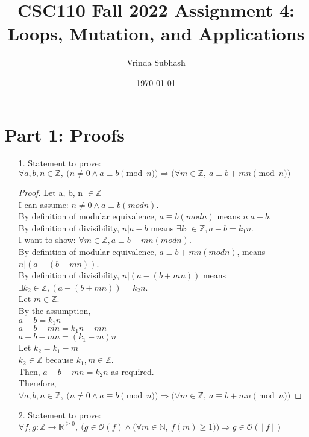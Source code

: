 \documentclass[11pt]{article}
\title{CSC110 Fall 2022 Assignment 4: Loops, Mutation, and Applications}
\author{Vrinda Subhash}
\date{\today}
\newcommand{\floor}[1]{\left\lfloor #1 \right\rfloor}
\begin{document}
\maketitle


\section*{Part 1: Proofs}

\begin{enumerate}
\item[1.] Statement to prove:
$\forall a, b, n \in \mathbb{Z},~ \big(n \neq 0 \land a \equiv b \pmod n \big) \Rightarrow \big(\forall m \in \mathbb{Z},~ a \equiv b + mn \pmod n\big)$

\begin{proof}
Let a, b, n $\in \mathbb{Z}$ \\
I can assume: $n \neq 0 \land a \equiv b (mod n)$. \\
By definition of modular equivalence,  $a \equiv b (mod n)$ means $n|a - b$. \\
By definition of divisibility, $n|a - b$ means $\exists k_1 \in \mathbb{Z}, a - b = k_1n$. \\
I want to show: $\forall m \in \mathbb{Z}, a \equiv b + mn (mod n)$. \\
By definition of modular equivalence, $a \equiv b + mn (mod n)$, means $n|(a- (b + mn))$. \\
By definition of divisibility, $n|(a- (b + mn))$ means $\exists k_2 \in \mathbb{Z}, (a - (b+mn)) = k_2n $. \\
Let $m \in \mathbb{Z}$. \\
By the assumption, \\
$a- b = k_1n$ \\
$a - b - mn = k_1n - mn$ \\
$a - b - mn = (k_1 - m ) n $ \\
Let $k_2 = k_1 - m $ \\
$k_2 \in \mathbb{Z}$ because $k_1, m \in \mathbb{Z}$. \\
Then, $a - b - mn = k_2n$ as required. \\
Therefore, $\forall a, b, n \in \mathbb{Z},~ \big(n \neq 0 \land a \equiv b \pmod n \big) \Rightarrow \big(\forall m \in \mathbb{Z},~ a \equiv b + mn \pmod n\big)$
\end{proof}

\newpage

\item[2.] Statement to prove:
$
\forall f, g: \mathbb{Z} \to \mathbb{R}^{\geq 0},~
\Big(g \in \mathcal{O}(f) \land \big(\forall m \in \mathbb{N},~ f(m) \geq 1) \Big) \Rightarrow
g \in \mathcal{O}(\floor{f})
$


\end{enumerate}
\end{document}
